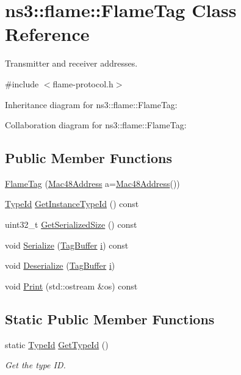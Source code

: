 \hypertarget{classns3_1_1flame_1_1FlameTag}{}\section{ns3\+:\+:flame\+:\+:Flame\+Tag Class Reference}
\label{classns3_1_1flame_1_1FlameTag}


Transmitter and receiver addresses.  




{\ttfamily \#include $<$flame-\/protocol.\+h$>$}



Inheritance diagram for ns3\+:\+:flame\+:\+:Flame\+Tag\+:


Collaboration diagram for ns3\+:\+:flame\+:\+:Flame\+Tag\+:
\subsection*{Public Member Functions}
\begin{DoxyCompactItemize}
\item 
\hyperlink{classns3_1_1flame_1_1FlameTag_a8171674b5b485ebe1afc5030eec4100b}{Flame\+Tag} (\hyperlink{classns3_1_1Mac48Address}{Mac48\+Address} a=\hyperlink{classns3_1_1Mac48Address}{Mac48\+Address}())
\item 
\hyperlink{classns3_1_1TypeId}{Type\+Id} \hyperlink{classns3_1_1flame_1_1FlameTag_a67b74feab1bfe6d3086cdf031c252ccc}{Get\+Instance\+Type\+Id} () const 
\item 
uint32\+\_\+t \hyperlink{classns3_1_1flame_1_1FlameTag_aeb5074c319583bb848212f1271cdb105}{Get\+Serialized\+Size} () const 
\item 
void \hyperlink{classns3_1_1flame_1_1FlameTag_abccf8dc0d163caf96f6502bcd07c29c5}{Serialize} (\hyperlink{classns3_1_1TagBuffer}{Tag\+Buffer} \hyperlink{lte__uplink__power__control_8m_a6f6ccfcf58b31cb6412107d9d5281426}{i}) const 
\item 
void \hyperlink{classns3_1_1flame_1_1FlameTag_a6c15b004176915696efcf8203de7f5fe}{Deserialize} (\hyperlink{classns3_1_1TagBuffer}{Tag\+Buffer} \hyperlink{lte__uplink__power__control_8m_a6f6ccfcf58b31cb6412107d9d5281426}{i})
\item 
void \hyperlink{classns3_1_1flame_1_1FlameTag_a102d21b65a41d70105c61d48ab09fdeb}{Print} (std\+::ostream \&os) const 
\end{DoxyCompactItemize}
\subsection*{Static Public Member Functions}
\begin{DoxyCompactItemize}
\item 
static \hyperlink{classns3_1_1TypeId}{Type\+Id} \hyperlink{classns3_1_1flame_1_1FlameTag_a7da70313911ac3b1d7e661a1f7c389a2}{Get\+Type\+Id} ()
\begin{DoxyCompactList}\small\item\em Get the type ID. \end{DoxyCompactList}\end{DoxyCompactItemize}
